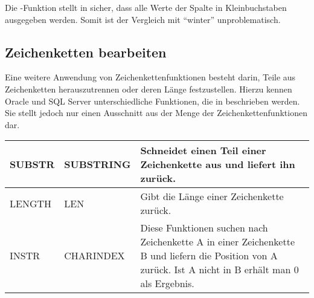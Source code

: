         Die -Funktion stellt in  sicher, dass alle Werte der Spalte  in Kleinbuchstaben ausgegeben werden. Somit ist der Vergleich mit \enquote{winter} unproblematisch.
      \subsection{Zeichenketten bearbeiten}
        Eine weitere Anwendung von Zeichenkettenfunktionen besteht darin, Teile aus Zeichenketten herauszutrennen oder deren L\"ange festzustellen. Hierzu kennen Oracle und SQL Server unterschiedliche Funktionen, die in  beschrieben werden. Sie stellt jedoch nur einen Ausschnitt aus der Menge der Zeichenkettenfunktionen dar.
        \begin{center}
          \label{srfstringfct2}
          \begin{small}
            \tabletail{
              \hline
            }
            \tablelasttail {
              \hline
            }
            \begin{supertabular}{|l|l|p{10cm}|}
              SUBSTR & SUBSTRING &  Schneidet einen Teil einer Zeichenkette aus und liefert ihn zur\"uck. \\
              \hline
              LENGTH & LEN &  Gibt die L\"ange einer Zeichenkette zur\"uck. \\
              \hline
              INSTR & CHARINDEX & Diese Funktionen suchen nach Zeichenkette A in
              einer Zeichenkette B und liefern die Position von A zur\"uck. Ist
              A nicht in B erh\"alt man 0 als Ergebnis. \\
            \end{supertabular}
          \end{small}
        \end{center}

